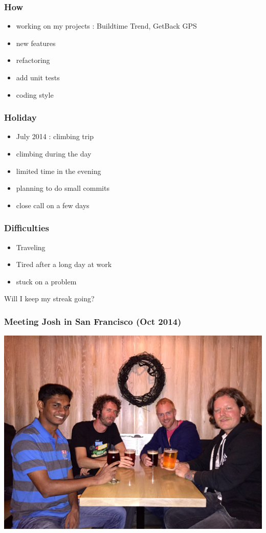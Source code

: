 \documentclass[14pt]{beamer}
\begin{document}
  \begin{frame}
    \frametitle{How}
    \begin{itemize}
      \item working on my projects : Buildtime Trend, GetBack GPS
      \item new features 
      \item refactoring
      \item add unit tests
      \item coding style
    \end{itemize}
  \end{frame}
  \begin{frame}
    \frametitle{Holiday}
    \begin{itemize}
      \item July 2014 : climbing trip
      \item climbing during the day
      \item limited time in the evening
      \item planning to do small commits
      \item close call on a few days
    \end{itemize}
  \end{frame}
  \begin{frame}
    \frametitle{Difficulties}
    \begin{itemize}
      \item Traveling
      \item Tired after a long day at work
      \item stuck on a problem
    \end{itemize}
    Will I keep my streak going?
  \end{frame}
  \begin{frame}
    \frametitle{Meeting Josh in San Francisco (Oct 2014)}
    \includegraphics[scale=.1]{josh_justin.jpg}
  \end{frame}
\end{document}

